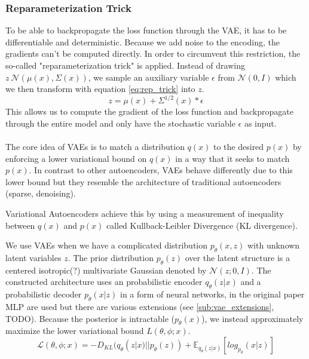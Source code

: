 \documentclass[twoside,11pt,a4paper]{article}
\theoremstyle{break}
\begin{document}
\subsubsection{Reparameterization Trick}
To be able to backpropagate the loss function through the VAE, it has to be differentiable and deterministic.
Because we add noise to the encoding, the gradients can't be computed directly. In order to circumvent this restriction, the so-called "reparameterization trick" is applied.
Instead of drawing $z ~ \mathcal{N}(\mu(x), \Sigma(x))$, we sample an auxiliary variable $\epsilon$ from $\mathcal{N}(0, I)$ which we then transform with equation \ref{eq:rep_trick} into $z$.
\begin{equation}
  \label{eq:rep_trick}
  z = \mu(x) + \Sigma^{1/2}(x)*\epsilon
\end{equation}
This allows us to compute the gradient of the loss function and backpropagate through the entire model and only have the stochastic variable $\epsilon$ as input.\\\\

The core idea of VAEs is to match a distribution $q(x)$ to the desired $p(x)$ by enforcing a lower variational bound on $q(x)$ in a way that it seeks to match $p(x)$.
In contrast to other autoencoders, VAEs behave differently due to this lower bound but they resemble the architecture of traditional autoencoders (sparse, denoising).



Variational Autoencoders achieve this by using a measurement of inequality between $q(x)$ and $p(x)$ called Kullback-Leibler Divergence (KL divergence).


We use VAEs when we have a complicated distribution $p_\theta(x,z)$ with unknown latent variables $z$.
The prior distribution $p_\theta(z)$ over the latent structure is a centered isotropic(?) multivariate Gaussian denoted by $\mathcal{N}(z;0, I)$.
The constructed architecture uses an probabilistic encoder $q_\theta(z|x)$ and a probabilistic decoder $p_\theta(x|z)$ in a form of neural networks, in the original paper MLP are used\cite{vae:2013} but there are various extensions (see \ref{sub:vae_extensions}, TODO).
Because the posterior is intractable ($p_\theta(x)$), we instead approximately maximize the lower variational bound $L(\theta,\phi;x)$.\\
\begin{equation}
  \mathcal{L}(\theta,\phi;x) = -D_{KL}(q_\theta(z|x)||p_\theta(z)) + \mathbb{E}_{q_\theta(z|x)}[log_{p_\theta}(x|z)]
\end{equation}
\end{document}
